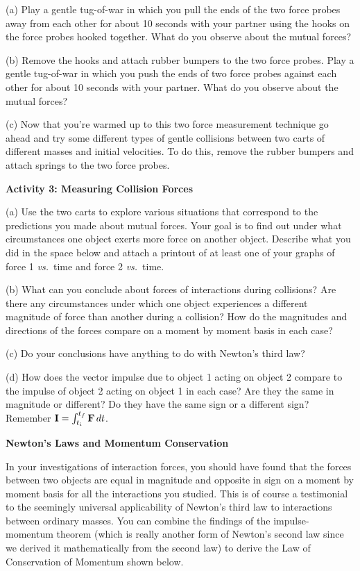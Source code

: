 (a) Play a gentle tug-of-war in which you pull the ends of the two force probes away from each other for about 10 seconds with your partner using the hooks on the force probes hooked together. What do you observe about the mutual forces?
\vspace{20mm}

(b) Remove the hooks and attach rubber bumpers to the two force probes. Play a gentle tug-of-war in which you push the ends of two force probes against each other for about 10 seconds with your partner. What do you observe about the mutual forces?
\vspace{20mm}

(c) Now that you're warmed up to this two force measurement technique go ahead and
try some different types of gentle collisions between two carts of different
masses and initial velocities. To do this, remove the rubber bumpers and attach springs to the two force probes.

\newpage
\textbf{Activity 3: Measuring Collision Forces }

(a) Use the two carts to explore various situations that correspond to the predictions
you made about mutual forces. Your goal is to find out under what circumstances
one object exerts more force on another object. Describe what you did in the
space below and attach a printout of at least one of your graphs of force 1 \textit{vs.}~time and force 2 \textit{vs.}~time.
\vspace{30mm}

(b) What can you conclude about forces of interactions during collisions? Are there any circumstances under which one object experiences a different magnitude of force
than another during a collision? How do the magnitudes and directions of the
forces compare on a moment by moment basis in each case? 
\vspace{30mm}

(c) Do your conclusions have anything to do with Newton's third law?
\vspace{20mm}

(d) How does the vector impulse due to object 1 acting on object 2 compare to
the impulse of object 2 acting on object 1 in each case? Are they the same in
magnitude or different? Do they have the same sign or a different sign? Remember
\( {\bf I}=\int _{t_{i}}^{t_{f}}{\bf F}\,dt \).
\vspace{20mm}

\textbf{Newton's Laws and Momentum Conservation} 

In your investigations of interaction forces, you should have found that the
forces between two objects are equal in magnitude and opposite in sign on a
moment by moment basis for all the interactions you studied. This is of course
a testimonial to the seemingly universal applicability of Newton's third law
to interactions between ordinary masses. You can combine the findings of the
impulse-momentum theorem (which is really another form of Newton's second law
since we derived it mathematically from the second law) to derive the Law of
Conservation of Momentum shown below.

